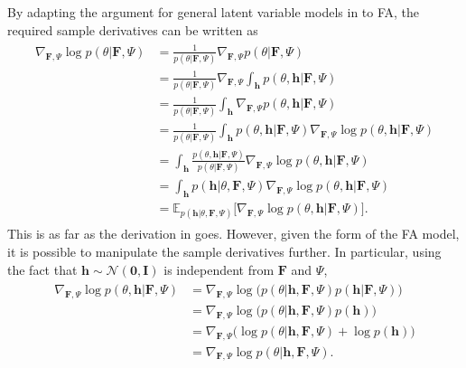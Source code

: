 \documentclass[msc,deptreport.inf]{infthesis} %
\newcommand{\matr}[1]{\mathbf{#1}}
\newcommand{\E}{\mathbb E}
\begin{document}
By adapting the argument for general latent variable models in \cite{barber2007} to FA, the required sample derivatives can be written as
\begin{align}\label{eqn:grad_log_likelihood}
\begin{split}
	\nabla_{\matr{F}, \Psi} \log p(\theta | \matr{F}, \Psi) 
	& = \frac{1}{p(\theta | \matr{F}, \Psi)} \nabla_{\matr{F}, \Psi} p(\theta | \matr{F}, \Psi) \\
	& = \frac{1}{p(\theta | \matr{F}, \Psi)} \nabla_{\matr{F}, \Psi} \int_\matr{h} p(\theta, \matr{h} | \matr{F}, \Psi) \\
	& = \frac{1}{p(\theta | \matr{F}, \Psi)} \int_\matr{h} \nabla_{\matr{F}, \Psi} p(\theta, \matr{h} | \matr{F}, \Psi) \\
	& = \frac{1}{p(\theta | \matr{F}, \Psi)} \int_\matr{h} p(\theta, \matr{h} | \matr{F}, \Psi) \nabla_{\matr{F}, \Psi} \log p(\theta, \matr{h} | \matr{F}, \Psi) \\
	& = \int_\matr{h} \frac{p(\theta, \matr{h} | \matr{F}, \Psi)}{p(\theta | \matr{F}, \Psi)} \nabla_{\matr{F}, \Psi} \log p(\theta, \matr{h} | \matr{F}, \Psi) \\
	& = \int_\matr{h} p(\matr{h} | \theta, \matr{F}, \Psi) \nabla_{\matr{F}, \Psi} \log p(\theta, \matr{h} | \matr{F}, \Psi) \\
	& = \E_{p(\matr{h} | \theta, \matr{F}, \Psi)} \big[ \nabla_{\matr{F}, \Psi} \log p(\theta, \matr{h} | \matr{F}, \Psi) \big].
\end{split}
\end{align}
This is as far as the derivation in \cite{barber2007} goes. However, given the form of the FA model, it is possible to manipulate the sample derivatives further. In particular, using the fact that $\matr{h} \sim \mathcal{N}(\matr{0}, \matr{I})$ is independent from $\matr{F}$ and $\Psi$,
\begin{align}\label{eqn:grad_log_complete_likelihood}
\begin{split}
	\nabla_{\matr{F}, \Psi} \log p(\theta, \matr{h} | \matr{F}, \Psi)
	& = \nabla_{\matr{F}, \Psi} \log \big(p(\theta | \matr{h}, \matr{F}, \Psi)p(\matr{h} | \matr{F}, \Psi)\big) \\
	& = \nabla_{\matr{F}, \Psi} \log \big(p(\theta | \matr{h}, \matr{F}, \Psi)p(\matr{h})\big) \\
	& = \nabla_{\matr{F}, \Psi} \big( \log p(\theta | \matr{h}, \matr{F}, \Psi) + \log p(\matr{h})\big) \\
	& = \nabla_{\matr{F}, \Psi} \log p(\theta | \matr{h}, \matr{F}, \Psi).
\end{split}
\end{align}
\end{document}
